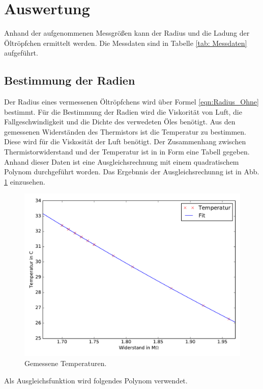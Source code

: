 \section{Auswertung}

Anhand der aufgenommenen Messgrößen kann der Radius und die Ladung der Öltröpfchen
ermittelt werden. Die Messdaten sind in Tabelle \ref{tab: Messdaten}
aufgeführt.

\subsection{Bestimmung der Radien}

Der Radius eines vermessenen Öltröpfchens wird über Formel \eqref{eqn:Radius_Ohne} bestimmt.
Für die Bestimmung der Radien wird die Viskorität von Luft, die Fallgeschwindigkeit
und die Dichte des verwedeten Öles benötigt.
Aus den gemessenen Widerständen des Thermistors ist die Temperatur zu bestimmen. Diese wird für die Viskosität der Luft benötigt. Der Zusammenhang zwischen
Thermistorwiderstand und der Temperatur ist in \cite{anleitung01} in Form eine Tabell gegeben.
Anhand dieser Daten ist eine Ausgleichsrechnung mit einem quadratischem Polynom
durchgeführt worden. Das Ergebnnis der Ausgleichsrechunng ist in Abb. \ref{fig:Temp}
einzusehen.

\begin{figure}
  \centering
  \includegraphics[width=\textwidth]{Pics/Temp.pdf}
  \caption{Gemessene Temperaturen.}
  \label{fig:Temp}
\end{figure}

Als Ausgleichsfunktion wird folgendes Polynom verwendet.

